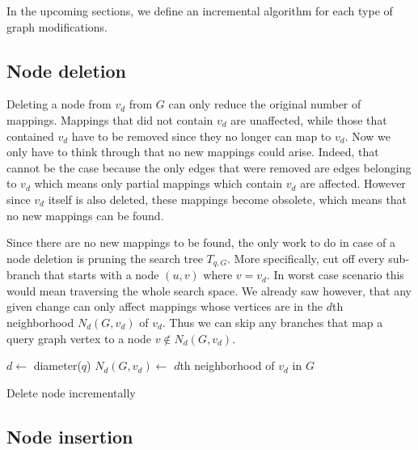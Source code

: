 In the upcoming sections, we define an incremental algorithm for each type of graph 
modifications.

\subsection{Node deletion}

Deleting a node from $v_d$ from $G$ can only reduce the original number of mappings.
Mappings that did not contain $v_d$ are unaffected, while those that contained $v_d$ 
have to be removed since they no longer can map to $v_d$. Now we only have to think 
through that no new mappings could arise. Indeed, that cannot be the case because
the only edges that were removed are edges belonging to $v_d$ which means only 
partial mappings which contain $v_d$ are affected. However since $v_d$ itself is also
deleted, these mappings become obsolete, which means that no new mappings can be
found.

Since there are no new mappings to be found, the only work to do in case of a node
deletion is pruning the search tree $T_{q, G}$. More specifically, cut off every
sub-branch that starts with a node $(u, v)$ where $v = v_d$. In worst case scenario
this would mean traversing the whole search space. We already saw however, that any
given change can only affect mappings whose vertices are in the $d$th neighborhood
$N_d(G, v_d)$ of $v_d$. Thus we can skip any branches that map a query graph vertex
to a node $v \notin N_d(G, v_d)$.

\begin{algorithm}[htp]
    \SetAlgoLined\DontPrintSemicolon
    \nl $d \gets $ diameter($q$)\;
    \nl $N_d(G, v_d) \gets$ $d$th neighborhood of $v_d$ in $G$\;
    \caption{Delete node incrementally}
\end{algorithm}

\subsection{Node insertion}

